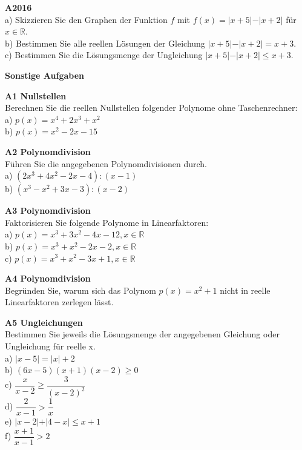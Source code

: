 \documentclass[landscape,twocolumn,a4paper]{article}
\begin{document}
\newpage

\textbf{A2016} \\
a) Skizzieren Sie den Graphen der Funktion $f$ mit 
$f(x) = \vert x + 5 \vert - \vert x+2 \vert$ für $x \in \mathbb{R}$. \\
b) Bestimmen Sie alle reellen Lösungen der Gleichung 
 $\vert x + 5 \vert - \vert x+2 \vert = x + 3$. \\
c) Bestimmen Sie die Lösungsmenge der Ungleichung 
 $\vert x + 5 \vert - \vert x+2 \vert \le x + 3$. 
 \bigskip
 
 \textbf{Sonstige Aufgaben}
 \bigskip
 
 \textbf{A1 Nullstellen} \\
 Berechnen Sie die reellen Nullstellen folgender Polynome ohne Taschenrechner: \\
 a) $p(x) = x^4+2x^3+x^2$ \\
 b) $p(x) = x^2 -2x -15$ 
 \bigskip
 
 \textbf{A2 Polynomdivision} \\
Führen Sie die angegebenen Polynomdivisionen durch. \\
 a) $(2x^3+4x^2-2x-4) : (x-1)$ \\
 b) $(x^3-x^2+3x-3) : (x-2)$
 \bigskip
 
 \textbf{A3 Polynomdivision} \\
 Faktorisieren Sie folgende Polynome in Linearfaktoren: \\
 a) $p(x) = x^3+3x^2-4x-12, x \in \mathbb{R}$ \\
 b) $p(x) = x^3 + x^2 -2x-2,    x \in \mathbb{R}$ \\
 c) $p(x) = x^3 + x^2 -3x+1,    x \in \mathbb{R}$ 
 \bigskip
 
 \textbf{A4 Polynomdivision} \\
Begründen Sie, warum sich das Polynom $p(x) = x^2 +1$ nicht in reelle Linearfaktoren zerlegen lässt.
 \bigskip
 
 \textbf{A5 Ungleichungen} \\
 Bestimmen Sie jeweils die Lösungsmenge der angegebenen Gleichung oder Ungleichung für reelle x.\\
 a) $\vert x- 5 \vert = \vert x \vert +2 $ \\
 b) $(6x-5)(x+1)(x-2) \ge 0$ \\
 c) $\dfrac{x}{x-2} \ge \dfrac{3}{(x-2)^2}$ \\
 d) $\dfrac{2}{x-1} > \dfrac{1}{x}$ \\
 e) $\vert x-2 \vert + \vert 4 - x \vert \le x + 1 $ \\
 f) $\dfrac{x+1}{x-1} > 2$
 
\end{document}
